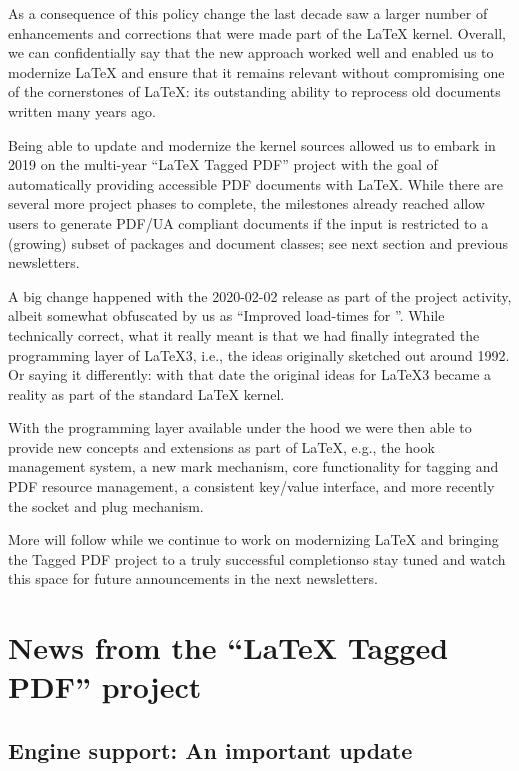 \documentclass{ltnews}
\providecommand\Dash {\unskip \textemdash}
\begin{document}
As a consequence of this policy change the last decade saw a larger
number of enhancements and corrections that were made part of the
\LaTeX{} kernel. Overall, we can confidentially say that the new
approach worked well and enabled us to modernize \LaTeX{} and ensure
that it remains relevant without compromising one of the cornerstones
of \LaTeX{}: its outstanding ability to reprocess old documents
written many years ago.

Being able to update and modernize the kernel sources allowed us to
embark in 2019 on the multi-year \enquote{\LaTeX{} Tagged PDF} project
with the goal of automatically providing accessible PDF documents with
\LaTeX{}. While there are several more project phases to complete, the
milestones already reached allow users to generate PDF/UA compliant
documents if the input is restricted to a (growing) subset of packages
and document classes; see next section and previous newsletters.

 A big change happened with the 2020-02-02 release as part of the project activity,
 albeit somewhat obfuscated by us as \enquote{Improved load-times for
   }. While technically correct, what it really meant is
 that we had finally integrated the programming layer of \LaTeX3,
 i.e., the ideas originally sketched out around 1992.  Or saying it
 differently: with that date the original ideas for \LaTeX3 became a
 reality as part of the standard \LaTeX{} kernel.

 With the programming layer available under the hood we were then able to
 provide new concepts and extensions as part of \LaTeX{},
 e.g., the hook management system, a new mark mechanism, core
 functionality for tagging and PDF resource management, a consistent
 key/value interface, and more recently the socket and plug mechanism.

 More will follow while we continue to work on modernizing \LaTeX{} and
 bringing the Tagged PDF project to a truly successful completion\Dash so
 stay tuned and watch this space for future announcements in the next
 newsletters.

 

\section{News from the \enquote{\LaTeX{} Tagged PDF} project}

\subsection{Engine support: An important update}
\end{document}

